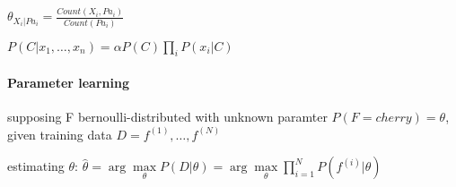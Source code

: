 \begin{multicols}{4}
$\theta_{X_i|Pa_i} = \frac{Count(X_i,Pa_i)}{Count(Pa_i)}$

$P(C|x_1,\dots,x_n) = \alpha P(C)\prod\limits_{i}P(x_i|C)$

\paragraph{Parameter learning} supposing F bernoulli-distributed with unknown paramter $P(F=cherry) = \theta$, given training data $D={f^{(1)},\dots,f^{(N)}}$

estimating $\theta$: $\hat{\theta} = \arg\max\limits_{\theta} P(D|\theta) = \arg\max\limits_{\theta} \prod\limits_{i=1}^{N}P(f^{(i)}|\theta)$

\end{multicols}
